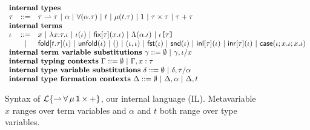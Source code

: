 \begin{figure}[p]
\small
$\begin{array}{lcl}%
\multicolumn{3}{>{$}l<{$}}{\textbf{internal types}}\\
\ity & ::= & \multicolumn{1}{l}{\iparr{\ity}{\ity} ~|~ \alpha ~|~ \iforall{\alpha}{\ity} ~|~ t ~|~ \imu{t}{\ity} ~|~ \iunit ~|~ \iprod{\ity}{\ity} ~|~ \isum{\ity}{\ity}}\\
\multicolumn{3}{>{$}l<{$}}{\textbf{internal terms}}\\
\itm & ::= & \multicolumn{1}{l}{x ~|~ \ilam{\ity}{x}{\itm} ~|~ \iap{\itm}{\itm} ~|~ \ifix{\ity}{x}{\itm} ~|~ \iLam{\alpha}{\itm} ~|~ \iAp{\ity}{\itm}}\\
& ~|~ & \ifold{t}{\ity}{\itm} ~|~ \iunfold{\itm} ~|~ \itriv ~|~ \ipair{\itm}{\itm} ~|~ \ifst{\itm} ~|~ \isnd{\itm} ~|~ \iinl{\ity}{\itm} ~|~ \iinr{\ity}{\itm} ~|~ \icase{\itm}{x}{\itm}{x}{\itm}\\
\multicolumn{3}{l}{\textbf{internal term variable substitutions}~\gamma ::=  \emptyset ~|~ \gamma, \iota/x}\\
\multicolumn{3}{l}{\textbf{internal typing contexts}~\Gamma ::= \emptyset ~|~ \Gamma, x : \tau}\\
\multicolumn{3}{l}{\textbf{internal type variable substitutions}~\delta ::=  \emptyset ~|~ \delta, \tau/\alpha}\\\multicolumn{3}{l}{\textbf{internal type formation contexts}~\Delta ::= \emptyset ~|~ \Delta, \alpha ~|~ \Delta, t}\\
\end{array}%
$
\caption[Syntax of Internal Language (IL)]{Syntax of {$\mathcal{L}\{{\rightharpoonup}\,{\forall}\,{\mu}\,{{\sf 1}}\,{\times}\,{+}\}$}, our internal language (IL). Metavariable $x$ ranges over term variables and $\alpha$ and $t$ both range over type variables.}
\label{syntax-IL}
\end{figure}


